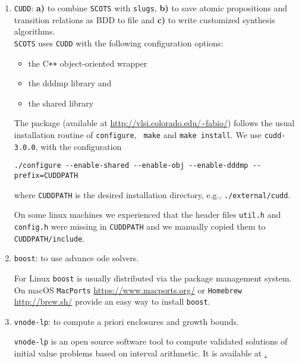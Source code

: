 \documentclass[a4paper]{amsart}
\newcommand\Cpp{C\texttt{++} }
\begin{document}
\begin{enumerate}
  \item
  \label{i:cudd}
  {\tt CUDD}: {\bf  a)} to combine {\tt SCOTS} with {\tt slugs}, {\bf b)} to save atomic propositions
  and transition relations as BDD to file and {\bf c)} to write customized
  synthesis algorithms.\\
  {\tt SCOTS} uses {\tt CUDD} with the following configuration options:
     \begin{itemize}
      \item the \Cpp{} object-oriented wrapper
      \item the dddmp library and
      \item the shared library 
    \end{itemize}
   The package (available at \url{http://vlsi.colorado.edu/~fabio/})
 follows the usual installation routine of {\tt \small configure}, {\tt
   \small make} and
   {\tt \small make install}. We use {\tt \small cudd-3.0.0}, with the
   configuration
  \begin{lstlisting}[basicstyle=\small\ttfamily,frame=none]
  ./configure --enable-shared --enable-obj --enable-dddmp --prefix=CUDDPATH
  \end{lstlisting}
  where {\tt CUDDPATH} is the desired installation directory, e.g., {\tt ./external/cudd}.

  On some linux machines we experienced that the header files {\tt \small util.h} and
  {\tt \small config.h} were missing in {\tt \small CUDDPATH} and we manually
  copied them to {\tt \small CUDDPATH/include}.

  \item {\tt boost}: to use advance ode solvers. 

  For Linux {\tt boost} is usually
  distributed via the package management system. On macOS {\tt MacPorts}
  \url{https://www.macports.org/} or {\tt Homebrew} \url{http://brew.sh/} provide an easy way to install
  {\tt boost}.

  \item {\tt vnode-lp}: to compute a priori enclosures and growth bounds.

  {\tt vnode-lp} is an open source software tool to compute validated solutions
  of initial value problems based on  interval arithmetic. It is available at
  \href{http://www.cas.mcmaster.ca/~nedialk/vnodelp}.


	\end{enumerate}




	
\newpage
\end{document}
